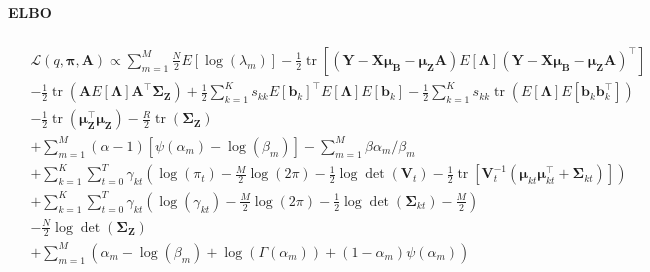 \documentclass[11pt,authoryear]{article}
\DeclareMathOperator*{\tr}{tr}
\newcommand{\bs}[1]{\boldsymbol{#1}}
\begin{document}
\paragraph{ELBO}
\begin{align}
\begin{split}
&\mathcal{L}(q, \bs{\pi}, \bs{A}) \propto \sum_{m = 1}^M \frac{N}{2}E\left[\log(\lambda_m)\right] - \frac{1}{2}\tr\left[(\bs{Y}-\bs{X}\bs{\mu}_{\bs{B}}-\bs{\mu}_{\bs{Z}}\bs{A})E[\bs{\Lambda}](\bs{Y}-\bs{X}\bs{\mu}_{\bs{B}} - \bs{\mu}_{\bs{Z}}\bs{A})^{\intercal}\right]\\
& -\frac{1}{2}\tr\left(\bs{A}E[\bs{\Lambda}]\bs{A}^{\intercal}\bs{\Sigma}_{\bs{Z}}\right) + \frac{1}{2}\sum_{k = 1}^Ks_{kk}E\left[\bs{b}_{k}\right]^{\intercal}E[\bs{\Lambda}]E\left[\bs{b}_{k}\right] - \frac{1}{2}\sum_{k = 1}^Ks_{kk}\tr\left(E[\bs{\Lambda}]E\left[\bs{b}_{k}\bs{b}_{k}^{\intercal}\right]\right)\\
&- \frac{1}{2} \tr(\bs{\mu}_{\bs{Z}}^{\intercal}\bs{\mu}_{\bs{Z}}) - \frac{R}{2}\tr(\bs{\Sigma}_{\bs{Z}})\\
&+ \sum_{m = 1}^M (\alpha - 1)[\psi(\alpha_m) - \log(\beta_m)] - \sum_{m = 1}^M\beta \alpha_m/\beta_m\\
&+\sum_{k = 1}^K \sum_{t = 0}^T \gamma_{kt}\left(\log(\pi_t) - \frac{M}{2}\log(2\pi) - \frac{1}{2}\log\det(\bs{V}_t) - \frac{1}{2}\tr\left[\bs{V}_t^{-1}(\bs{\mu}_{kt}\bs{\mu}_{kt}^{\intercal} + \bs{\Sigma}_{kt})\right]\right)\\
&+\sum_{k = 1}^K \sum_{t = 0}^T \gamma_{kt}\left(\log(\gamma_{kt}) - \frac{M}{2}\log(2\pi) - \frac{1}{2}\log\det(\bs{\Sigma}_{kt}) - \frac{M}{2}\right)\\
&-\frac{N}{2}\log\det(\bs{\Sigma}_{\bs{Z}})\\
&+\sum_{m = 1}^M \left( \alpha_m - \log(\beta_m) + \log(\Gamma(\alpha_m)) + (1 - \alpha_m)\psi(\alpha_m)\right)
\end{split}
\end{align}
\end{document}

